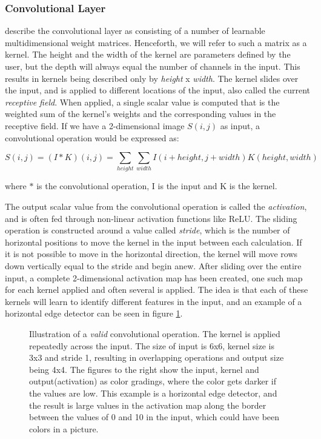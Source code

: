     \subsubsection{Convolutional Layer}
     \citeauthor{o2015introduction_convolutions}\cite{o2015introduction_convolutions} describe the convolutional layer as consisting of a number of learnable multidimensional weight matrices. Henceforth, we will refer to such a matrix as a kernel. The height and the width of the kernel are parameters defined by the user, but the depth will always equal the number of channels in the input. This results in kernels being described only by \textit{height} x \textit{width}. The kernel slides over the input, and is applied to different locations of the input, also called the current \textit{receptive field}. When applied, a single scalar value is computed that is the weighted sum of the kernel's weights and the corresponding values in the receptive field. If we have a 2-dimensional image $S(i,j)$ as input, a convolutional operation would be expressed as\cite{Goodfellow-et-al-2016_convolution}:
     
        \begin{equation}
            S(i,j) = (I*K)(i,j) = \sum_{height}\sum_{width}I(i+height,j+width)K(height,width)
        \end{equation}
     
     where $*$ is the convolutional operation, I is the input and K is the kernel.
     
     The output scalar value from the convolutional operation is called the \textit{activation}, and is often fed through non-linear activation functions like ReLU\cite{o2015introduction_convolutions}. The sliding operation is constructed around a value called \textit{stride}, which is the number of horizontal positions to move the kernel in the input between each calculation. If it is not possible to move in the horizontal direction, the kernel will move rows down vertically equal to the stride and begin anew. After sliding over the entire input, a complete 2-dimensional activation map has been created, one such map for each kernel applied and often several is applied. The idea is that each of these kernels will learn to identify different features in the input, and an example of a horizontal edge detector can be seen in figure \ref{convolutional_fig}. 
    \begin{figure}[H]
        \centering
                
        \caption[Horizontal edge detector example]{Illustration of a \textit{valid} convolutional operation. The kernel is applied repeatedly across the input. The size of input is 6x6, kernel size is 3x3 and stride 1, resulting in overlapping operations and output size being 4x4. The figures to the right show the input, kernel and output(activation) as color gradings, where the color gets darker if the values are low. This example is a horizontal edge detector, and the result is large values in the activation map along the border between the values of 0 and 10 in the input, which could have been colors in a picture.}
      	\medskip 
        \label{convolutional_fig}
    \end{figure}
    

